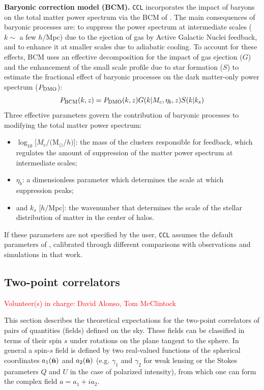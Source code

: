 \documentclass[\docopts]{\docclass}
\newcommand{\nv}{\hat{\bf n}}
\newcommand{\vol}[1]{\textcolor{red}{Volunteer(s) in charge: #1}}
\newcommand{\ccl}{{\tt CCL}\xspace}
\begin{document}
 {\bf Baryonic correction model (BCM).} \ccl incorporates the impact of baryons on the total matter power spectrum via the BCM of \citet{Schneider15}. The main consequences of baryonic processes are: to suppress the power spectrum at intermediate scales ($k\sim$ a few $h/$Mpc) due to the ejection of gas by Active Galactic Nuclei feedback, and to enhance it at smaller scales due to adiabatic cooling. To account for these effects, BCM uses an effective decomposition for the impact of gas ejection ($G$) and the enhancement of the small scale profile due to star formation ($S$) to estimate the fractional effect of baryonic processes on the dark matter-only power spectrum ($P_{\rm DMO}$):
\begin{equation}
  P_{\rm BCM}(k,z)=P_{\rm DMO}(k,z) G(k|M_c,\eta_b,z)S(k|k_s)
\end{equation}
Three effective parameters govern the contribution of baryonic processes to modifying the total matter power spectrum:
 \begin{itemize}
   \item $\log_{10} [M_c/($M$_\odot/h)]$: the mass of the clusters responsible for feedback, which regulates the amount of suppression of the matter power spectrum at intermediate scales;
   \item $\eta_b$: a dimensionless parameter which determines the scale at which suppression peaks;
   \item and $k_s$ [$h/$Mpc]: the wavenumber that determines the scale of the stellar distribution of matter in the center of halos.
 \end{itemize}
 If these parameters are not specified by the user, \ccl assumes the default parameters of \citet{Schneider15}, calibrated through different comparisons with observations and simulations in that work.

\subsection{Two-point correlators}
\vol{David Alonso, Tom McClintock}

This section describes the theoretical expectations for the two-point correlators of pairs of quantities (fields) defined on the sky. These fields can be classified in terms of their spin $s$ under rotations on the plane tangent to the sphere. In general a spin-$s$ field is defined by two real-valued functions of the spherical coordinates $a_1(\nv)$ and $a_2(\nv)$ (e.g. $\gamma_1$ and $\gamma_2$ for weak lensing or the Stokes parameters $Q$ and $U$ in the case of polarized intensity), from which one can form the complex field $a=a_1+ia_2$.
\end{document}
